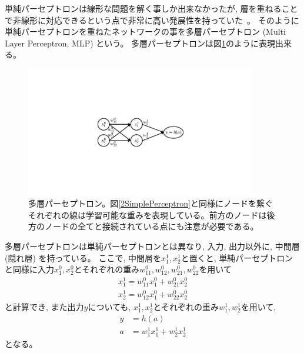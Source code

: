 単純パーセプトロンは線形な問題を解く事しか出来なかったが, 層を重ねることで非線形に対応できるという点で非常に高い発展性を持っていた~\cite{ApproximationSuperpositionsSigmoidalFunction}。
そのように単純パーセプトロンを重ねたネットワークの事を多層パーセプトロン (Multi Layer Perceptron, MLP) という。
多層パーセプトロンは図\ref{4MultiLayerPerceptron}のように表現出来る。

\begin{figure}[htbp]
 \centering
 \includegraphics[trim = 250 350 250 350, width=0.9\textwidth, clip]{Figure/2DeepLearning/4MultiLayerPerceptron.png}
 \caption[多層パーセプトロン]{多層パーセプトロン。図\ref{2SimplePerceptron}と同様にノードを繋ぐそれぞれの線は学習可能な重みを表現している。前方のノードは後方のノードの全てと接続されている点にも注意が必要である。}
 \label{4MultiLayerPerceptron}
\end{figure}

多層パーセプトロンは単純パーセプトロンとは異なり, 入力, 出力以外に, 中間層 (隠れ層) を持っている。
ここで, 中間層を$x^1_1,x^1_2$と置くと, 単純パーセプトロンと同様に入力$x^0_1,x^0_2$とそれぞれの重み$w^0_{11},w^0_{12},w^0_{21},w^0_{22}$を用いて
\begin{equation}
 \begin{split}
  x^1_1 = w^0_{11}x^0_1 + w^0_{21}x^0_2 \\
  x^1_2 = w^0_{12}x^0_1 + w^0_{22}x^0_2
 \end{split} 
\end{equation}
と計算でき, また出力$y$についても, $x^1_1,x^1_2$とそれぞれの重み$w^1_{1},w^1_{2}$を用いて, 
\begin{equation}
 \begin{split}
  y &= h(a)\\
  a &= w^1_{1}x^1_1 + w^1_{2}x^1_2
 \end{split}
\end{equation}
となる。

